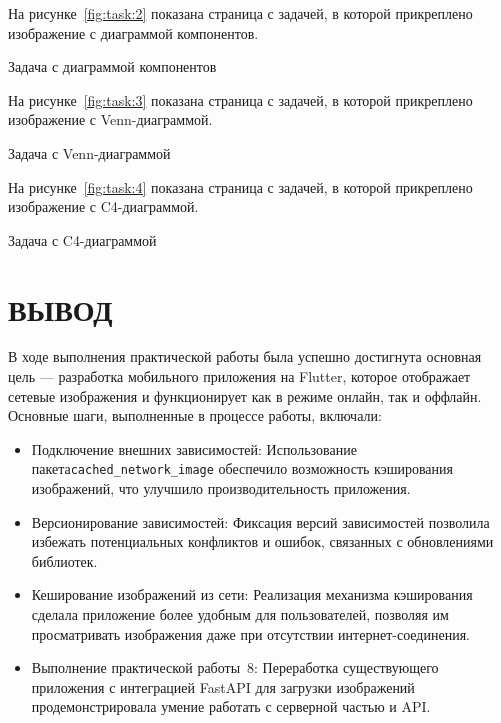 На рисунке~\ref{fig:task:2} показана страница с задачей,
в которой прикреплено изображение с диаграммой компонентов.

\begin{image}
	\caption{Задача с диаграммой компонентов}
	\label{fig:task:2}
\end{image}

На рисунке~\ref{fig:task:3} показана страница с задачей,
в которой прикреплено изображение с Venn-диаграммой.

\begin{image}
	\caption{Задача с Venn-диаграммой}
	\label{fig:task:3}
\end{image}

На рисунке~\ref{fig:task:4} показана страница с задачей,
в которой прикреплено изображение с C4-диаграммой.

\begin{image}
	\caption{Задача с C4-диаграммой}
	\label{fig:task:4}
\end{image}

\clearpage

\section*{ВЫВОД}

В ходе выполнения практической работы
была успешно достигнута основная цель --- разработка мобильного приложения
на Flutter, которое отображает сетевые изображения
и функционирует как в режиме онлайн, так и оффлайн.
Основные шаги, выполненные в процессе работы, включали:

\begin{itemize}
	\item Подключение внешних зависимостей:
		Использование пакета\texttt{cached\_network\_image} 
		обеспечило возможность кэширования изображений,
		что улучшило производительность приложения.
	\item Версионирование зависимостей:
		Фиксация версий зависимостей позволила избежать
		потенциальных конфликтов и ошибок, связанных с обновлениями библиотек.
	\item Кеширование изображений из сети:
		Реализация механизма кэширования сделала приложение более удобным
		для пользователей, позволяя им просматривать изображения даже
		при отсутствии интернет-соединения.
	\item Выполнение практической работы \No\,8:
		Переработка существующего приложения с интеграцией FastAPI
		для загрузки изображений продемонстрировала умение работать
		с серверной частью и API.
\end{itemize}

